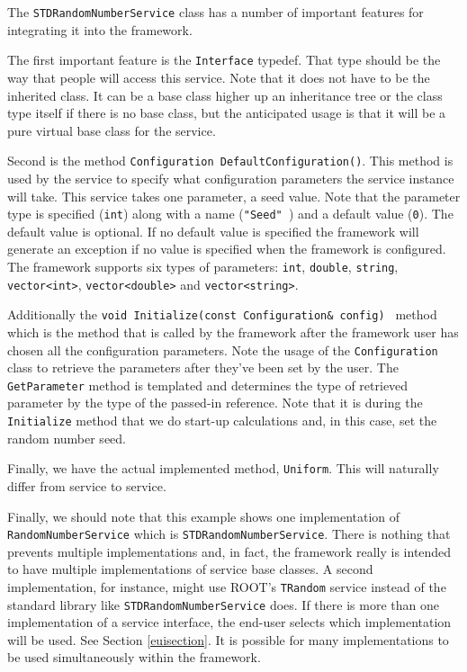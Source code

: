 \documentclass[12pt]{article}
\begin{document}
The {\tt STDRandomNumberService} class has a number of important 
features for integrating it into the framework.  

The first important feature is the {\tt Interface} typedef.  That type
should be the way that people will access this service.  Note that it does
not have to be the inherited class.  It can be a base class higher up an
inheritance tree or the class type itself if there is no base class, but 
the anticipated usage is that it will be a pure virtual
base class for the service.

Second is the 
method {\tt Configuration DefaultConfiguration()}.  
This method is 
used by the service to specify what configuration parameters the 
service instance will take.  This service takes one parameter, a seed value.
Note that the parameter type is specified ({\tt int}) along with a name
({\tt "Seed" }) and a default value ({\tt 0}).  The default value is
optional.  If no default value is specified the framework will generate
an exception if no value is specified when the framework is configured.
The framework supports six types of parameters: {\tt int}, {\tt double},
{\tt string}, {\tt vector<int>}, {\tt vector<double>} and
{\tt vector<string>}.

Additionally the {\tt void Initialize(const Configuration\& config) }
method which is the method that is called by the framework after the 
framework user has chosen all the configuration parameters.  Note the usage
of the {\tt Configuration} class to retrieve the parameters after they've been
set by the user.  The {\tt GetParameter} method is templated and determines
the type of retrieved parameter by the type of the passed-in reference.
Note that it is during the {\tt Initialize} method that we do start-up
calculations and, in this case, set the random number seed.

Finally, we have the actual implemented method, {\tt Uniform}.  This will
naturally differ from service to service.  

Finally, we should note that this example shows one implementation of 
{\tt RandomNumberService} which is {\tt STDRandomNumberService}.  There
is nothing that prevents multiple implementations and, in fact, the 
framework really is intended to have multiple implementations of 
service base classes.  A second implementation, for instance, might use
ROOT's {\tt TRandom} service instead of the standard library like 
{\tt STDRandomNumberService} does.  
If there is more than one implementation of a service interface, the
end-user selects which implementation will be used.  See Section 
\ref{euisection}. It is possible
for many implementations to be used simultaneously within the framework.
\end{document}

